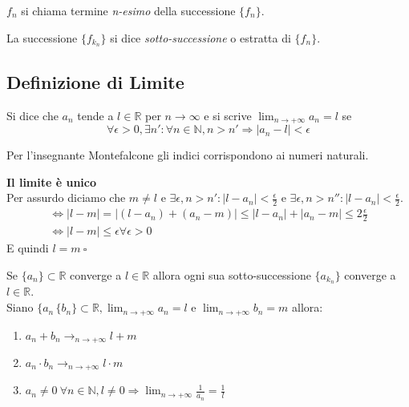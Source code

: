 \documentclass{article}
\begin{document}
\vspace{2mm} $f_n$ si chiama termine \textit{n-esimo} della successione $\{f_n\}$.

La successione $\{f_{k_n}\}$ si dice \textit{sotto-successione} o estratta di $\{f_n\}$.

\subsection{Definizione di Limite}

Si dice che $a_n$ tende a $l \in \mathbb{R}$ per $n \rightarrow \infty$ e si scrive $\lim_{n \to + \infty}a_n=l$ se
\begin{equation*}
	\forall \epsilon > 0, \exists n': \forall n \in \mathbb{N}, n>n' \Rightarrow |a_n - l|<\epsilon
\end{equation*}

Per l'insegnante Montefalcone gli indici corrispondono ai numeri naturali.

\begin{dimostrazione}\textbf{Il limite è unico}\\
	Per assurdo diciamo che $m \neq l$ e $ \exists \epsilon,n>n': |l-a_n|<\frac{\epsilon}{2}$ e $\exists \epsilon,n>n'': |l-a_n|<\frac{\epsilon}{2}$.
	\begin{align*}
		\iff |l-m|=|(l-a_n)+(a_n-m)| \leq |l-a_n|+|a_n-m| \leq 2\frac{\epsilon}{2}\\
		\iff |l-m| \leq \epsilon \forall \epsilon >0
	\end{align*}
	E quindi $l=m \ \square$

\end{dimostrazione}

Se $\{a_n\} \subset \mathbb{R}$ converge a $l \in \mathbb{R}$ allora ogni sua sotto-successione $\{a_{k_n}\}$ converge a $l \in \mathbb{R}$.\\

Siano $ \{a_n\, \{b_n\} \subset \mathbb{R}, \lim_{n \to + \infty} a_n= l$ e $\lim_{n \to + \infty} b_n= m$ allora:
\begin{enumerate}
	\item $a_n+b_n \rightarrow_{n \rightarrow + \infty} l + m$
	\item $a_n \cdot b_n \rightarrow_{n \rightarrow + \infty} l \cdot m $
	\item $a_n \neq 0 \ \forall n \in \mathbb{N}, l \neq 0 \Rightarrow \lim_{n \to + \infty} \frac{1}{a_n}= \frac{1}{l}$
\end{enumerate}
\end{document}
